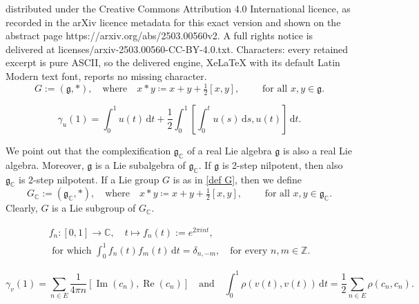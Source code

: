 \documentclass[10pt,a4paper]{amsart}
\newcommand{\C}{\mathbb C}
\newcommand{\Z}{\mathbb Z}
\newcommand{\coloneq}{\coloneqq}
\newcommand{\de}{\mathrm{d}}
\newcommand{\g}{\mathfrak{g}}
\newcommand{\im}{\operatorname{Im}}
\newcommand{\re}{\operatorname{Re}}
\begin{document}
distributed under the Creative Commons Attribution 4.0 International licence, as recorded in the arXiv licence metadata for this exact version and shown on the abstract page https://arxiv.org/abs/2503.00560v2. A full rights notice is delivered at licenses/arxiv-2503.00560-CC-BY-4.0.txt. Characters: every retained excerpt is pure ASCII, so the delivered engine, XeLaTeX with its default Latin Modern text font, reports no missing character.
\begin{equation} \label{def G}
 G:= (\g,*), \quad \text{where} \quad x*y \coloneq x+y+\tfrac{1}{2}[x,y], \qquad \text{ for all } x,y \in \g.
\end{equation}

	\begin{equation} \label{formula integral}
		\gamma_u(1) = \int^1_0 u(t) \, \de t + \frac{1}{2} \int^1_0 \left[\int^t_0 u(s) \, \de s, u(t) \right] \, \de t. 
	\end{equation}

\begin{remark}
 We point out that the complexification $\g_\C$ of a real Lie algebra $\g$ is also a real Lie algebra. Moreover, $\g$ is a Lie subalgebra of $\g_\C$. If $\g$ is 2-step nilpotent, then also $\g_\C$ is 2-step nilpotent. If a Lie group $G$ is as in \eqref{def G}, then we define 
 \begin{equation} \label{def Gc}
 G_\C:= (\g_\C,*), \quad \text{where} \quad x*y \coloneq x+y+\tfrac{1}{2}[x,y], \qquad \text{ for all } x,y \in \g_\C.
\end{equation}
Clearly, $G$ is a Lie subgroup of $G_\C$.
\end{remark}

\begin{gather} 
 f_n \colon [0,1] \to \C, \quad t \mapsto f_n(t):= e^{2\pi i n t}, \label{def_f}\\
 \text { for which }\int^1_0 f_n(t)f_m(t) \, \de t = \delta_{n,-m}, \quad \text{for every $n,m \in \Z$.} \label{def_f_prop}
\end{gather}

\begin{equation} \label{complex_endpoint}
 \gamma_v(1) = \sum_{n \in E} \frac{1}{4 \pi n} [\im(c_n),\re(c_n)] \quad \text{and} \quad \int^1_0 \rho(v(t),v(t)) \, \de t = \frac{1}{2} \sum_{n \in E} \rho(c_n,c_n).
\end{equation}
\end{document}

